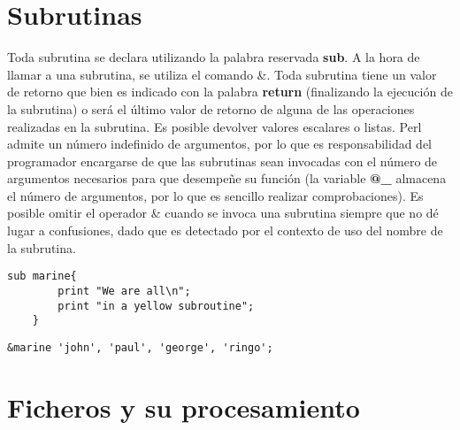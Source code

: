 \documentclass[12pt,a4paper]{memoir} %
\begin{document}
	\chapter{Subrutinas}
	Toda subrutina se declara utilizando la palabra reservada \textbf{sub}. A la hora de llamar a una subrutina, se utiliza el comando \&. Toda subrutina tiene un valor de retorno que bien es indicado con la palabra \textbf{return} (finalizando la ejecución de la subrutina) o será el último valor de retorno de alguna de las operaciones realizadas en la subrutina. Es posible devolver valores escalares o listas.\newline
	Perl admite un número indefinido de argumentos, por lo que es responsabilidad del programador encargarse de que las subrutinas sean invocadas con el número de argumentos necesarios para que desempeñe su función (la variable \textbf{@\_} almacena el número de argumentos, por lo que es sencillo realizar comprobaciones).
	Es posible omitir el operador \& cuando se invoca una subrutina siempre que no dé lugar a confusiones, dado que es detectado por el contexto de uso del nombre de la subrutina.
	\begin{lstlisting}[frame=single, showspaces=false, showstringspaces=false]
	sub marine{
		print "We are all\n";
		print "in a yellow subroutine";
	}
	\end{lstlisting}
	\begin{lstlisting}[frame=single, showspaces=false, showstringspaces=false]
&marine 'john', 'paul', 'george', 'ringo';
	\end{lstlisting}
	
	
	
	\chapter{Ficheros y su procesamiento}
\end{document}
